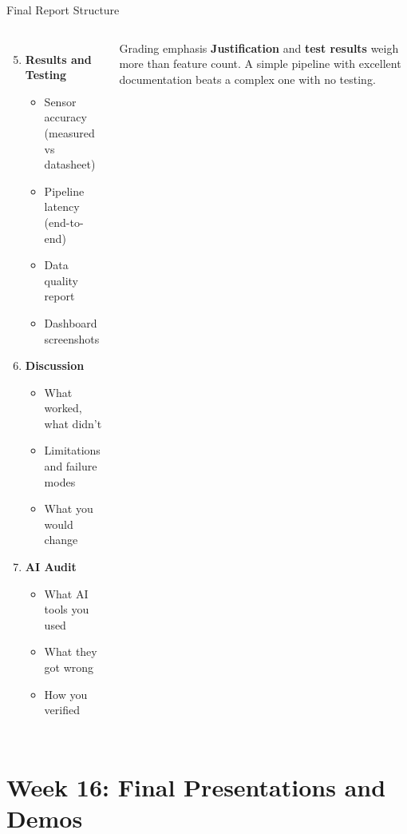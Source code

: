 \documentclass[aspectratio=169,11pt]{beamer}
\begin{document}
\begin{frame}{Final Report Structure}
\begin{columns}
        \begin{enumerate}
            \setcounter{enumi}{4}
            \item \textbf{Results and Testing}
            \begin{itemize}
                \item Sensor accuracy (measured vs datasheet)
                \item Pipeline latency (end-to-end)
                \item Data quality report
                \item Dashboard screenshots
            \end{itemize}
            \item \textbf{Discussion}
            \begin{itemize}
                \item What worked, what didn't
                \item Limitations and failure modes
                \item What you would change
            \end{itemize}
            \item \textbf{AI Audit}
            \begin{itemize}
                \item What AI tools you used
                \item What they got wrong
                \item How you verified
            \end{itemize}
        \end{enumerate}

        \vspace{0.1cm}
        \begin{alertblock}{Grading emphasis}
            \textbf{Justification} and \textbf{test results} weigh more than feature count. A simple pipeline with excellent documentation beats a complex one with no testing.
        \end{alertblock}
    \end{columns}
\end{frame}

\section{Week 16: Final Presentations and Demos}
\end{document}
